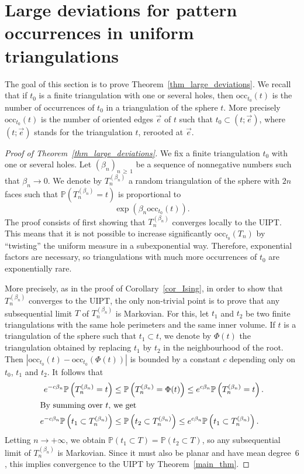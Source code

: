 \documentclass[10pt]{amsart}
\theoremstyle{definition}\newtheorem{defi}[theo]{Definition}\newtheorem{rema}[theo]{Remark}\newtheorem{exam}[theo]{Example}\newtheorem{exem}[theo]{Example}\newtheorem{nota}[theo]{Notation}
\renewcommand{\P}{\mathbb{P}}
\newcommand{\occ}{\mathrm{occ}}
\begin{document}
\section{Large deviations for pattern occurrences in uniform triangulations}

The goal of this section is to prove Theorem~\ref{thm_large_deviations}. We recall that if $t_0$ is a finite triangulation with one or several holes, then $\occ_{t_0}(t)$ is the number of occurrences of $t_0$ in a triangulation of the sphere $t$. More precisely $\occ_{t_0}(t)$ is the number of oriented edges $\vec{e}$ of $t$ such that $t_0 \subset (t;\vec{e})$, where $(t;\vec{e})$ stands for the triangulation $t$, rerooted at $\vec{e}$.

\begin{proof}[Proof of Theorem~\ref{thm_large_deviations}]
We fix a finite triangulation $t_0$ with one or several holes. Let $(\beta_n)_{n\,\geq\,1}$ be a sequence of nonnegative numbers such that $\beta_n \to 0$. We denote by $T_n^{(\beta_n)}$ a random triangulation of the sphere with $2n$ faces such that $\P (T_n^{(\beta_n)}=t)$ is proportional to
\[
\exp \left(\beta_n \occ_{t_0}(t) \right).
\]
The proof consists of first showing that $T_n^{(\beta_n)}$ converges locally to the UIPT. This means that it is not possible to increase significantly $\occ_{t_0}(T_n)$ by ``twisting'' the uniform measure in a subexponential way. Therefore, exponential factors are necessary, so triangulations with much more occurrences of $t_0$ are exponentially rare.

More precisely, as in the proof of Corollary~\ref{cor_Ising}, in order to show that $T_n^{(\beta_n)}$ converges to the UIPT, the only non-trivial point is to prove that any subsequential limit $T$ of $T_n^{(\beta_n)}$ is Markovian. For this, let $t_1$ and $t_2$ be two finite triangulations with the same hole perimeters and the same inner volume. If $t$ is a triangulation of the sphere such that $t_1 \subset t$, we denote by $\Phi(t)$ the triangulation obtained by replacing $t_1$ by $t_2$ in the neighbourhood of the root. Then $|\occ_{t_0}(t)-\occ_{t_0}(\Phi(t))|$ is bounded by a constant $c$ depending only on $t_0$, $t_1$ and $t_2$. It follows that
\begin{align*}
e^{-c \beta_n} \P \left(T_n^{(\beta_n)}=t \right) &\leq \P \left(T_n^{(\beta_n)}=\Phi(t) \right) \leq e^{c \beta_n} \P \left(T_n^{(\beta_n)}=t \right).
\\
\intertext{By summing over $t$, we get}
e^{-c \beta_n} \P \left(t_1 \subset T_n^{(\beta_n)} \right) &\leq \P \left(t_2 \subset T_n^{(\beta_n)} \right) \leq e^{c \beta_n} \P \left(t_1 \subset T_n^{(\beta_n)} \right).
\end{align*}
Letting $n \to +\infty$, we obtain $\P (t_1 \subset T )=\P (t_2 \subset T )$, so any subsequential limit of $T_n^{(\beta_n)}$ is Markovian. Since it must also be planar and have mean degree~$6$, this implies convergence to the UIPT by Theorem~\ref{main_thm}.


\end{proof}
\end{document}
